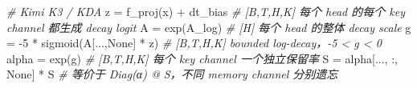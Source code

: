 \documentclass[
  11pt,
  a4paper,
  fontset=none]{ctexart}
\newenvironment{Shaded}{}{}
\newcommand{\CommentTok}[1]{\textcolor[rgb]{0.38,0.63,0.69}{\textit{#1}}}
\newcommand{\DecValTok}[1]{\textcolor[rgb]{0.25,0.63,0.44}{#1}}
\newcommand{\NormalTok}[1]{#1}
\newcommand{\OperatorTok}[1]{\textcolor[rgb]{0.40,0.40,0.40}{#1}}
\newcommand{\VariableTok}[1]{\textcolor[rgb]{0.10,0.09,0.49}{#1}}
\begin{document}
\begin{Shaded}
\begin{Highlighting}[]
\CommentTok{\# Kimi K3 / KDA}
\NormalTok{z }\OperatorTok{=}\NormalTok{ f\_proj(x) }\OperatorTok{+}\NormalTok{ dt\_bias       }\CommentTok{\# [B,T,H,K] 每个 head 的每个 key channel 都生成 decay logit}
\NormalTok{A }\OperatorTok{=}\NormalTok{ exp(A\_log)                }\CommentTok{\# [H] 每个 head 的整体 decay scale}
\NormalTok{g }\OperatorTok{=} \OperatorTok{{-}}\DecValTok{5} \OperatorTok{*}\NormalTok{ sigmoid(A[...,}\VariableTok{None}\NormalTok{] }\OperatorTok{*}\NormalTok{ z)  }\CommentTok{\# [B,T,H,K] bounded log{-}decay，{-}5 \textless{} g \textless{} 0}
\NormalTok{alpha }\OperatorTok{=}\NormalTok{ exp(g)                }\CommentTok{\# [B,T,H,K] 每个 key channel 一个独立保留率}
\NormalTok{S }\OperatorTok{=}\NormalTok{ alpha[..., :, }\VariableTok{None}\NormalTok{] }\OperatorTok{*}\NormalTok{ S   }\CommentTok{\# 等价于 Diag(α) @ S，不同 memory channel 分别遗忘}
\end{Highlighting}
\end{Shaded}
\end{document}
